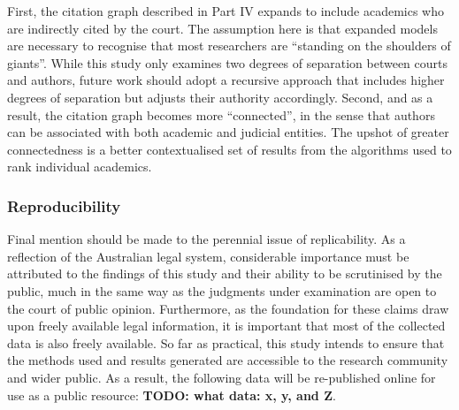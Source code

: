 First, the citation graph described in Part IV expands to include academics who are indirectly cited by the court. The assumption here is that expanded models are necessary to recognise that most researchers are ``standing on the shoulders of giants''. While this study only examines two degrees of separation between courts and authors, future work should adopt a recursive approach that includes higher degrees of separation but adjusts their authority accordingly. Second, and as a result, the citation graph becomes more ``connected'', in the sense that authors can be associated with both academic and judicial entities. The upshot of greater connectedness is a better contextualised set of results from the algorithms used to rank individual academics.

\subsubsection{Reproducibility}

Final mention should be made to the perennial issue of replicability. As a reflection of the Australian legal system, considerable importance must be attributed to the findings of this study and their ability to be scrutinised by the public, much in the same way as the judgments under examination are open to the court of public opinion. Furthermore, as the foundation for these claims draw upon freely available legal information, it is important that most of the collected data is also freely available. So far as practical, this study intends to ensure that the methods used and results generated are accessible to the research community and wider public. As a result, the following data will be re-published online for use as a public resource: \textbf{TODO: what data: x, y, and Z}.
